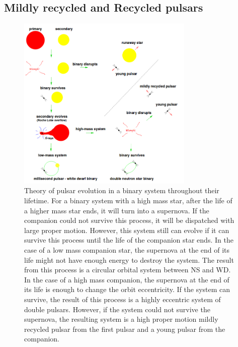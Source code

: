 \documentclass[thesis_msc.tex]{subfiles}
\begin{document}
\subsection{Mildly recycled and Recycled pulsars}

\begin{figure}[h] \centering \includegraphics[width=0.75\textwidth]{figures/evo.png}
\caption{Theory of pulsar evolution in a binary system throughout their lifetime. For a binary system with a high mass star, after the life of a higher mass star ends, it will turn into a supernova. If the companion could not survive this process, it will be dispatched with large proper motion. However, this system still can evolve if it can survive this process until the life of the companion star ends. In the case of a low mass companion star, the supernova at the end of its life might not have enough energy to destroy the system. The result from this process is a circular orbital system between NS and WD. In the case of a high mass companion, the supernova at the end of its life is enough to change the orbit eccentricity. If the system can survive, the result of this process is a highly eccentric system of double pulsars. However, if the system could not survive the supernova, the resulting system is a high proper motion mildly recycled pulsar from the first pulsar and a young pulsar from the companion.   }

\label{evo}
\end{figure}
\end{document}
